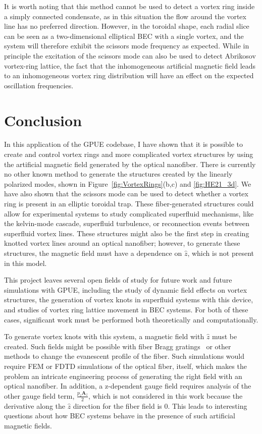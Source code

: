 It is worth noting that this method cannot be used to detect a vortex ring inside a simply connected condensate, as in this situation the flow around the vortex line has no preferred direction.
However, in the toroidal shape, each radial slice can be seen as a two-dimensional elliptical BEC with a single vortex, and the system will therefore exhibit the scissors mode frequency as expected.
While in principle the excitation of the scissors mode can also be used to detect Abrikosov vortex-ring lattice, the fact that the inhomogeneous artificial magnetic field leads to an inhomogeneous vortex ring distribution will have an effect on the expected oscillation frequencies.

\section{Conclusion}

In this application of the GPUE codebase, I have shown that it is possible to create and control vortex rings and more complicated vortex structures by using the artificial magnetic field generated by the optical nanofiber.
There is currently no other known method to generate the structures created by the linearly polarized modes, shown in Figure~\ref{fig:VortexRings}(b,c) and \ref{fig:HE21_3d}.
We have also shown that the scissors mode can be used to detect whether a vortex ring is present in an elliptic toroidal trap.
These fiber-generated structures could allow for experimental systems to study complicated superfluid mechanisms, like the kelvin-mode cascade, superfluid turbulence, or reconnection events between superfluid vortex lines.
These structures might also be the first step in creating knotted vortex lines around an optical nanofiber; however, to generate these structures, the magnetic field must have a dependence on $\hat z$, which is not present in this model.

This project leaves several open fields of study for future work and future simulations with GPUE, including the study of dynamic field effects on vortex structures, the generation of vortex knots in superfluid systems with this device, and studies of vortex ring lattice movement in BEC systems.
For both of these cases, significant work must be performed both theoretically and computationally.

To generate vortex knots with this system, a magnetic field with $\hat z$ must be created.
Such fields might be possible with fiber Bragg gratings~\cite{hill1997} or other methods to change the evanescent profile of the fiber.
Such simulations would require FEM or FDTD simulations of the optical fiber, itself, which makes the problem an intricate engineering process of generating the right field with an optical nanofiber.
In addition, a z-dependent gauge field requires analysis of the other gauge field term, $\frac{p_z\mathbf{A}_z}{2}$, which is not considered in this work because the derivative along the $\hat z$ direction for the fiber field is 0.
This leads to interesting questions about how BEC systems behave in the presence of such artificial magnetic fields.

